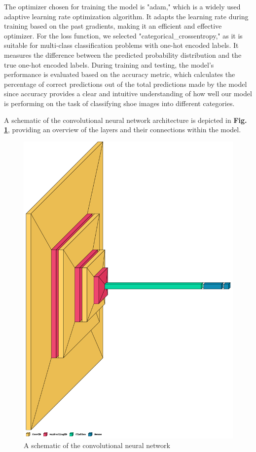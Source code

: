 \documentclass[11pt,a4paper]{article}
\begin{document}
The optimizer chosen for training the model is "adam," which is a widely used adaptive learning rate optimization algorithm. It adapts the learning rate during training based on the past gradients, making it an efficient and effective optimizer.
For the loss function, we selected "categorical\_crossentropy," as it is suitable for multi-class classification problems with one-hot encoded labels. It measures the difference between the predicted probability distribution and the true one-hot encoded labels.
During training and testing, the model's performance is evaluated based on the accuracy metric, which calculates the percentage of correct predictions out of the total predictions made by the model since accuracy provides a clear and intuitive understanding of how well our model is performing on the task of classifying shoe images into different categories.

A schematic of the convolutional neural network architecture is depicted in \textbf{Fig. \ref{schema}}, providing an overview of the layers and their connections within the model.

 \begin{figure}[h!]
 \centering
  \includegraphics[width=0.85\linewidth]{schema.png}
  \caption{A schematic of the convolutional neural network}
  \label{schema}
\end{figure}
\end{document}
